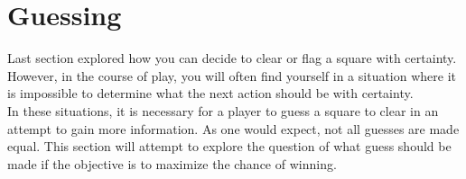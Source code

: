 \chapter{Guessing}\label{sec:guessing}

Last section explored how you can decide to clear or flag a square with certainty. However, in the course of play, you will often find yourself in a situation where it is impossible to determine what the next action should be with certainty.\\

In these situations, it is necessary for a player to guess a square to clear in an attempt to gain more information. As one would expect, not all guesses are made equal. This section will attempt to explore the question of what guess should be made if the objective is to maximize the chance of winning.\\









